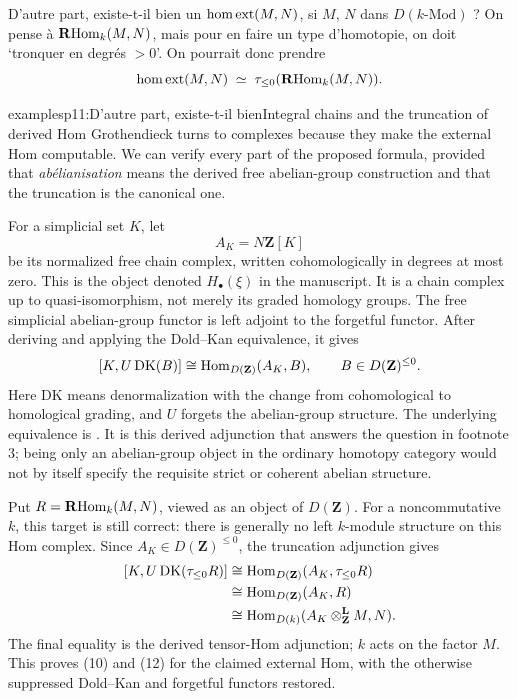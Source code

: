 D’autre part, existe-t-il bien un $\mathrm{hom}\,\mathrm{ext}(M,N)$, si $M$, $N$ dans $D(k\text{-Mod})$ ? On pense à $\mathbf{R}\mathrm{Hom}_k(M,N)$, mais pour en faire un type d’homotopie, on doit ‘tronquer en degrés $>0$’. On pourrait donc prendre
\[
\mathrm{hom}\,\mathrm{ext}(M,N)\;\simeq\;\tau_{\le 0}(\mathbf{R}\mathrm{Hom}_k(M,N)).
\]

\begin{dcomment}{examples}{p11:D’autre part, existe-t-il bien}{Integral chains and the truncation of derived Hom}
Grothendieck turns to complexes because they make the external Hom computable. We can verify every part of the proposed formula, provided that \emph{abélianisation} means the derived free abelian-group construction and that the truncation is the canonical one.

For a simplicial set \(K\), let
\[
 A_K=N\mathbf Z[K]
\]
be its normalized free chain complex, written cohomologically in degrees at most zero. This is the object denoted \(H_\bullet(\xi)\) in the manuscript. It is a chain complex up to quasi-isomorphism, not merely its graded homology groups. The free simplicial abelian-group functor is left adjoint to the forgetful functor. After deriving and applying the Dold--Kan equivalence, it gives
\[
 [K,U\,\mathrm{DK}(B)]
 \cong
 \mathrm{Hom}_{D(\mathbf Z)}(A_K,B),
 \qquad B\in D(\mathbf Z)^{\leq0}.
\]
Here \(\mathrm{DK}\) means denormalization with the change from cohomological to homological grading, and \(U\) forgets the abelian-group structure. The underlying equivalence is \citet[Theorem 14.24.3]{StacksDoldKan}. It is this derived adjunction that answers the question in footnote 3; being only an abelian-group object in the ordinary homotopy category would not by itself specify the requisite strict or coherent abelian structure.

Put \(R=\mathbf R\mathrm{Hom}_k(M,N)\), viewed as an object of \(D(\mathbf Z)\). For a noncommutative \(k\), this target is still correct: there is generally no left \(k\)-module structure on this Hom complex. Since \(A_K\in D(\mathbf Z)^{\leq0}\), the truncation adjunction gives
\[
\begin{aligned}
 {}[K,U\,\mathrm{DK}(\tau_{\leq0}R)]
 &\cong\mathrm{Hom}_{D(\mathbf Z)}(A_K,\tau_{\leq0}R)\\
 &\cong\mathrm{Hom}_{D(\mathbf Z)}(A_K,R)\\
 &\cong\mathrm{Hom}_{D(k)}(A_K\otimes_{\mathbf Z}^{\mathbf L}M,N).
\end{aligned}
\]
The final equality is the derived tensor-Hom adjunction; \(k\) acts on the factor \(M\). This proves (10) and (12) for the claimed external Hom, with the otherwise suppressed Dold--Kan and forgetful functors restored.


\end{dcomment}
